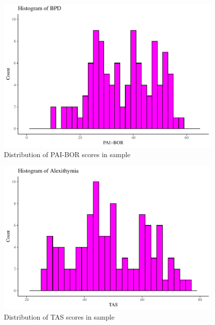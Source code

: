 \documentclass[
  man,floatsintext]{apa7}
\begin{document}
\begin{figure}
\includegraphics[width=1\linewidth]{d2m-Psychopathy_files/figure-latex/PAI-descriptives-1} \caption{Distribution of PAI-BOR scores in sample}\label{fig:PAIBOR-descriptives-appendix}
\end{figure}

\begin{figure}
\includegraphics[width=1\linewidth]{d2m-Psychopathy_files/figure-latex/TAS-descriptives-1} \caption{Distribution of TAS scores in sample}\label{fig:TAS-descriptives-appendix}
\end{figure}
\end{document}
